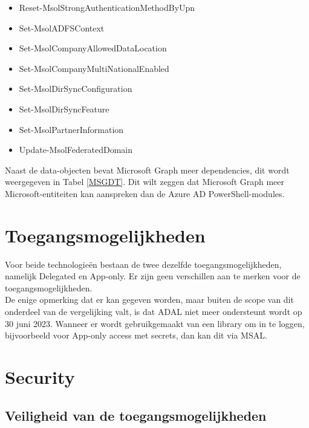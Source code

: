 \begin{itemize}
\begin{itemize}
        \item Reset-MsolStrongAuthenticationMethodByUpn
        \item Set-MsolADFSContext
        \item Set-MsolCompanyAllowedDataLocation
        \item Set-MsolCompanyMultiNationalEnabled
        \item Set-MsolDirSyncConfiguration
        \item Set-MsolDirSyncFeature
        \item Set-MsolPartnerInformation
        \item Update-MsolFederatedDomain    
    \end{itemize}
\end{itemize}

Naast de data-objecten bevat Microsoft Graph meer dependencies, dit wordt weergegeven in Tabel \ref{MSGDT}. Dit wilt zeggen dat Microsoft Graph meer Microsoft-entiteiten kan aanspreken dan de Azure \ac{AD} PowerShell-modules. 


\section{Toegangsmogelijkheden}



Voor beide technologieën bestaan de twee dezelfde toegangsmogelijkheden, namelijk Delegated en App-only. Er zijn geen verschillen aan te merken voor de toegangsmogelijkheden. \\

De enige opmerking dat er kan gegeven worden, maar buiten de scope van dit onderdeel van de vergelijking valt, is dat \ac{ADAL} niet meer ondersteunt wordt op 30 juni 2023. Wanneer er wordt gebruikgemaakt van een library om in te loggen, bijvoorbeeld voor App-only access met secrets, dan kan dit via \ac{MSAL}.



\section{Security}

\subsection{Veiligheid van de toegangsmogelijkheden}

